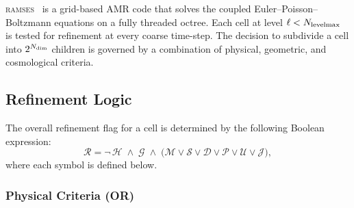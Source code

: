 \documentclass[fleqn,usenatbib]{mnras}
\newcommand{\ramses}{\textsc{ramses}}
\newcommand{\nlevelmax}{N_{\rm levelmax}}
\newcommand{\twotondim}{2^{N_{\rm dim}}}
\begin{document}
\ramses\ \citep{Teyssier2002} is a grid-based AMR code that solves
the coupled Euler--Poisson--Boltzmann equations on a fully threaded
octree.  Each cell at level $\ell < \nlevelmax$ is tested for
refinement at every coarse time-step.  The decision to subdivide a
cell into $\twotondim$ children is governed by a combination of
physical, geometric, and cosmological criteria.

\subsection{Refinement Logic}
\label{sec:refine_logic}

The overall refinement flag for a cell is determined by the following
Boolean expression:
\begin{equation}
\mathcal{R} = \lnot\,\mathcal{H}
  \;\land\; \mathcal{G}
  \;\land\; \bigl(
    \mathcal{M} \lor \mathcal{S} \lor \mathcal{D} \lor \mathcal{P}
    \lor \mathcal{U} \lor \mathcal{J}
  \bigr),
\label{eq:refine_flag}
\end{equation}
where each symbol is defined below.

\subsubsection{Physical Criteria (OR)}
\end{document}
